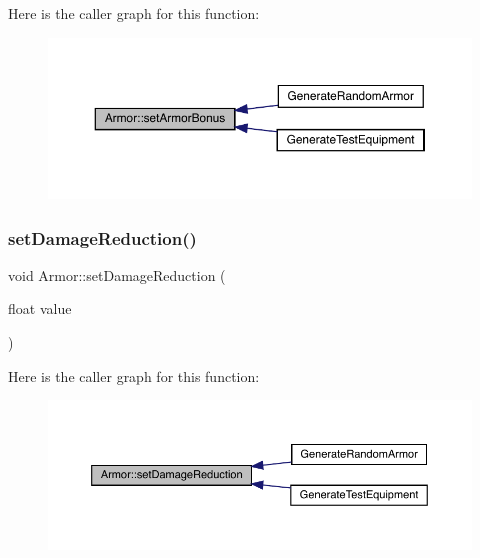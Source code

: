 Here is the caller graph for this function\+:
\nopagebreak
\begin{figure}[H]
\begin{center}
\leavevmode
\includegraphics[width=350pt]{d9/d76/class_armor_a14c15f72741f2a3dec28c746b3678c20_icgraph}
\end{center}
\end{figure}
\mbox{\label{class_armor_a08f926ae8438bae04058c22b098c6fcf}} 
\subsubsection{\texorpdfstring{set\+Damage\+Reduction()}{setDamageReduction()}}
{\footnotesize\ttfamily void Armor\+::set\+Damage\+Reduction (\begin{DoxyParamCaption}\item[{float}]{value }\end{DoxyParamCaption})}

Here is the caller graph for this function\+:
\nopagebreak
\begin{figure}[H]
\begin{center}
\leavevmode
\includegraphics[width=350pt]{d9/d76/class_armor_a08f926ae8438bae04058c22b098c6fcf_icgraph}
\end{center}
\end{figure}
\mbox{\label{class_armor_ab48309e3f16d226d56af617c65350698}} 
